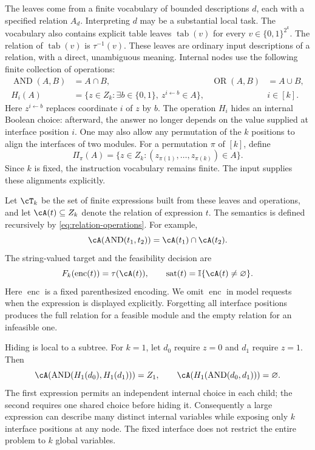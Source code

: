 \documentclass[11pt,twoside]{article}
\newcommand{\I}{\mathbb I}
\newcommand{\enc}{\operatorname{enc}}
\newcommand{\tab}{\operatorname{tab}}
\newcommand{\sat}{\operatorname{sat}}
\theoremstyle{definition}
\theoremstyle{remark}
\begin{document}
The leaves come from a finite vocabulary of bounded descriptions $d$, each
with a specified relation $A_d$. Interpreting $d$ may be a substantial local
task. The vocabulary also contains explicit table leaves $\tab(v)$ for
every $v\in\{0,1\}^{2^k}$. The relation of $\tab(v)$ is $\tau^{-1}(v)$.
These leaves are ordinary input descriptions of a relation,
with a direct, unambiguous meaning. Internal nodes use the following
finite collection of operations:
\begin{align}
 \operatorname{AND}(A,B)&=A\cap B, &
 \operatorname{OR}(A,B)&=A\cup B,\\
 H_i(A)&=\{z\in Z_k:\exists b\in\{0,1\},\ z^{i\leftarrow b}\in A\},
 &&i\in[k].
 \label{eq:relation-operations}
\end{align}
Here $z^{i\leftarrow b}$ replaces coordinate $i$ of $z$ by $b$.
The operation $H_i$ hides an internal Boolean choice: afterward, the answer
no longer depends on the value supplied at interface position $i$.
One may also allow any permutation of the $k$ positions to align the
interfaces of two modules. For a permutation $\pi$ of $[k]$, define
\begin{equation}
 \Pi_\pi(A)=\{z\in Z_k:(z_{\pi(1)},\ldots,z_{\pi(k)})\in A\}.
 \label{eq:permute-relation}
\end{equation}
Since $k$ is fixed, the instruction vocabulary
remains finite. The input supplies these alignments explicitly.

Let $\cT_k$ be the set of finite expressions built from these leaves and
operations, and let $\cA(t)\subseteq Z_k$ denote the relation of expression
$t$. The semantics is defined recursively by
\eqref{eq:relation-operations}. For example,
\begin{equation}
 \cA(\operatorname{AND}(t_1,t_2))=\cA(t_1)\cap\cA(t_2).
 \label{eq:target-relation}
\end{equation}
The string-valued target and the feasibility decision are
\begin{equation}
 F_k(\enc(t))=\tau(\cA(t)),\qquad
 \sat(t)=\I\{\cA(t)\ne\varnothing\}.
 \label{eq:encoded-target}
\end{equation}
Here $\enc$ is a fixed parenthesized encoding. We omit $\enc$ in model
requests when the expression is displayed explicitly.
Forgetting all interface positions produces the full relation for a
feasible module and the empty relation for an infeasible one.

Hiding is local to a subtree. For $k=1$, let $d_0$ require $z=0$ and $d_1$
require $z=1$. Then
\begin{equation}
 \cA(\operatorname{AND}(H_1(d_0),H_1(d_1)))=Z_1,\qquad
 \cA(H_1(\operatorname{AND}(d_0,d_1)))=\varnothing.
 \label{eq:hiding-scope}
\end{equation}
The first expression permits an independent internal choice in each child;
the second requires one shared choice before hiding it. Consequently a
large expression can describe many distinct internal variables while
exposing only $k$ interface positions at any node. The fixed interface
does not restrict the entire problem to $k$ global variables.
\end{document}

